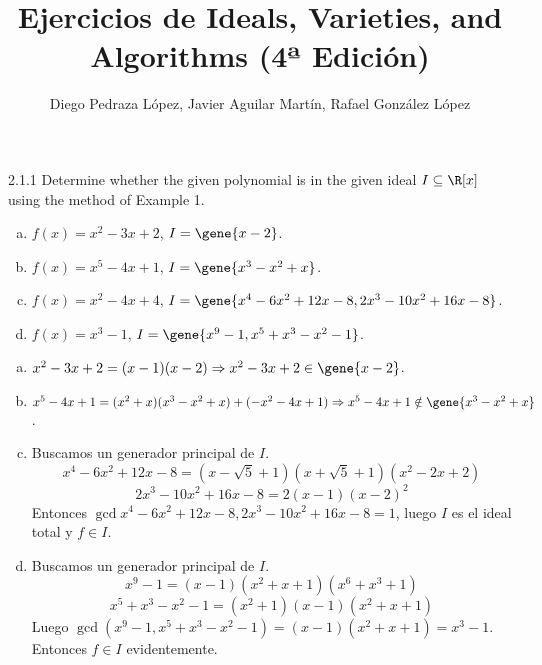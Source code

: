 \documentclass[twoside]{article}
\begin{document}
\title{Ejercicios de Ideals, Varieties, and Algorithms (4ª Edición)}
\author{Diego Pedraza López, Javier Aguilar Martín, Rafael González López}
\maketitle

\begin{ejercicio}{2.1.1}
Determine whether the given polynomial is in the given ideal $I \subseteq \R[x]$ using the method of Example 1.
\begin{enumerate}[a.]
\item $f(x) = x^2-3x+2$, $I = \gene{x-2}$.
\item $f(x) = x^5-4x+1$, $I = \gene{x^3-x^2+x}$.
\item $f(x) = x^2-4x+4$, $I = \gene{x^4-6x^2+12x-8,2x^3-10x^2+16x-8}$.
\item $f(x) = x^3-1$, $I = \gene{x^9-1,x^5+x^3-x^2-1}$.
\end{enumerate}
\end{ejercicio}
\begin{solucion}
\begin{enumerate}[a.]
\item $x^2-3x+2 = (x-1)(x-2) \Rightarrow x^2-3x+2 \in \gene{x-2}$.
\item $x^5-4x+1 = (x^2+x)(x^3-x^2+x)+(-x^2-4x+1) \Rightarrow x^5-4x+1 \notin \gene{x^3-x^2+x}$.
\item Buscamos un generador principal de $I$.
\[ x^4-6x^2+12x-8 = (x-\sqrt{5}+1)(x+\sqrt{5}+1)(x^2-2x+2) \]
\[ 2x^3-10x^2+16x-8 = 2(x-1)(x-2)^2 \]
Entonces $\gcd{x^4-6x^2+12x-8,2x^3-10x^2+16x-8}=1$, luego $I$ es el ideal total y $f \in I$.
\item Buscamos un generador principal de $I$.
\[ x^9-1 = (x-1)(x^2+x+1)(x^6+x^3+1) \]
\[ x^5+x^3-x^2-1 = (x^2+1)(x-1)(x^2+x+1) \]
Luego $\gcd(x^9-1,x^5+x^3-x^2-1) = (x-1)(x^2+x+1) = x^3-1$.
Entonces $f \in I$ evidentemente.
\end{enumerate}
\end{solucion}

\newpage
\end{document}
